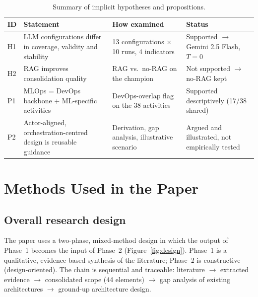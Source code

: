 \documentclass[11pt,a4paper]{article}
\begin{document}
\begin{table}[h]
\centering
\caption{Summary of implicit hypotheses and propositions.}
\small
\begin{tabularx}{\textwidth}{@{}L{0.9cm}XL{3.4cm}L{3.2cm}@{}}
\toprule
ID & Statement & How examined & Status \\
\midrule
H1 & LLM configurations differ in coverage, validity and stability & 13 configurations $\times$ 10 runs, 4 indicators & Supported $\rightarrow$ Gemini 2.5 Flash, $T=0$ \\
H2 & RAG improves consolidation quality & RAG vs.\ no-RAG on the champion & Not supported $\rightarrow$ no-RAG kept \\
P1 & MLOps = DevOps backbone + ML-specific activities & DevOps-overlap flag on the 38 activities & Supported descriptively (17/38 shared) \\
P2 & Actor-aligned, orchestration-centred design is reusable guidance & Derivation, gap analysis, illustrative scenario & Argued and illustrated, not empirically tested \\
\bottomrule
\end{tabularx}
\end{table}

\section{Methods Used in the Paper}\label{sec:methods}

\subsection{Overall research design}

The paper uses a two-phase, mixed-method design in which the output of Phase~1 becomes the input of Phase~2 (Figure~\ref{fig:design}). Phase~1 is a qualitative, evidence-based synthesis of the literature; Phase~2 is constructive (design-oriented). The chain is sequential and traceable: literature $\rightarrow$ extracted evidence $\rightarrow$ consolidated scope (44 elements) $\rightarrow$ gap analysis of existing architectures $\rightarrow$ ground-up architecture design.
\end{document}
